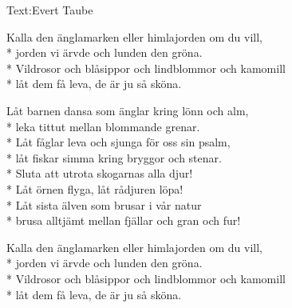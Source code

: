 \pagestyle{Sommarvisor}
\begin{SongText}[Änglamark]
    \begin{SongInfo}
        Text:Evert Taube
    \end{SongInfo}
    \begin{SongVerse}
        Kalla den änglamarken eller himlajorden om du vill,\\*%
        jorden vi ärvde och lunden den gröna.\\*%
        Vildrosor och blåsippor och lindblommor och kamomill\\*%
        låt dem få leva, de är ju så sköna.
    \end{SongVerse}
    \begin{SongVerse}
        Låt barnen dansa som änglar kring lönn och alm,\\*%
        leka tittut mellan blommande grenar.\\*%
        Låt fåglar leva och sjunga för oss sin psalm,\\*%
        låt fiskar simma kring bryggor och stenar.\\*%
        Sluta att utrota skogarnas alla djur!\\*%
        Låt örnen flyga, låt rådjuren löpa!\\*%
        Låt sista älven som brusar i vår natur\\*%
        brusa alltjämt mellan fjällar och gran och fur!
    \end{SongVerse}
    \begin{SongVerse}
        Kalla den änglamarken eller himlajorden om du vill,\\*%
        jorden vi ärvde och lunden den gröna.\\*%
        Vildrosor och blåsippor och lindblommor och kamomill\\*%
        låt dem få leva, de är ju så sköna.
    \end{SongVerse}
\end{SongText}
